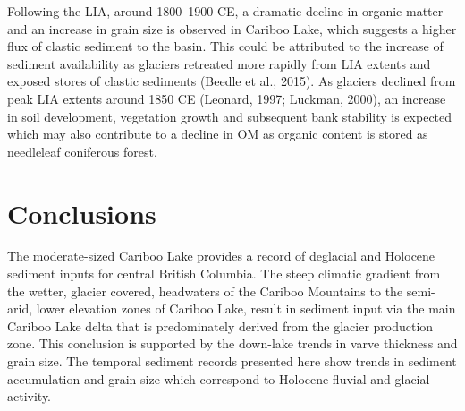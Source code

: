 \documentclass[
  letterpaper,
  DIV=11,
  numbers=noendperiod]{scrartcl}
\begin{document}
Following the LIA, around 1800--1900 CE, a dramatic decline in organic
matter and an increase in grain size is observed in Cariboo Lake, which
suggests a higher flux of clastic sediment to the basin. This could be
attributed to the increase of sediment availability as glaciers
retreated more rapidly from LIA extents and exposed stores of clastic
sediments (Beedle et al., 2015). As glaciers declined from peak LIA
extents around 1850 CE (Leonard, 1997; Luckman, 2000), an increase in
soil development, vegetation growth and subsequent bank stability is
expected which may also contribute to a decline in OM as organic content
is stored as needleleaf coniferous forest.

\hypertarget{conclusions}{%
\section{Conclusions}\label{conclusions}}

The moderate-sized Cariboo Lake provides a record of deglacial and
Holocene sediment inputs for central British Columbia. The steep
climatic gradient from the wetter, glacier covered, headwaters of the
Cariboo Mountains to the semi-arid, lower elevation zones of Cariboo
Lake, result in sediment input via the main Cariboo Lake delta that is
predominately derived from the glacier production zone. This conclusion
is supported by the down-lake trends in varve thickness and grain size.
The temporal sediment records presented here show trends in sediment
accumulation and grain size which correspond to Holocene fluvial and
glacial activity.
\end{document}
